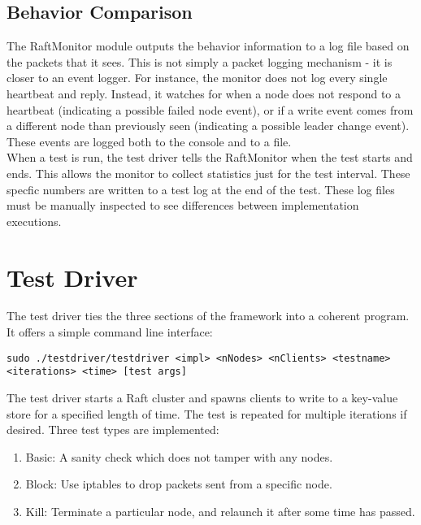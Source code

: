 \documentclass[UTF8]{article}
\begin{document}
\subsection{Behavior Comparison}
The RaftMonitor module outputs the behavior information to a log file based on the packets that it sees. This is not simply a packet logging mechanism - it is closer to an event logger. For instance, the monitor does not log every single heartbeat and reply. Instead, it watches for when a node does not respond to a heartbeat (indicating a possible failed node event), or if a write event comes from a different node than previously seen (indicating a possible leader change event). These events are logged both to the console and to a file.
\\ \indent When a test is run, the test driver tells the RaftMonitor when the test starts and ends. This allows the monitor to collect statistics just for the test interval. These specfic numbers are written to a test log at the end of the test. These log files must be manually inspected to see differences between implementation executions.

\section{Test Driver}
The test driver ties the three sections of the framework into a coherent program. It offers a simple command line interface:
\begin{lstlisting}
sudo ./testdriver/testdriver <impl> <nNodes> <nClients> <testname>  <iterations> <time> [test args]
\end{lstlisting}

The test driver starts a Raft cluster and spawns clients to write to a key-value store for a specified length of time. The test is repeated for multiple iterations if desired. Three test types are implemented:

\begin{enumerate}
  \item Basic: A sanity check which does not tamper with any nodes.
  \item Block: Use iptables to drop packets sent from a specific node.
  \item Kill: Terminate a particular node, and relaunch it after some time has passed.
\end{enumerate}
\end{document}
